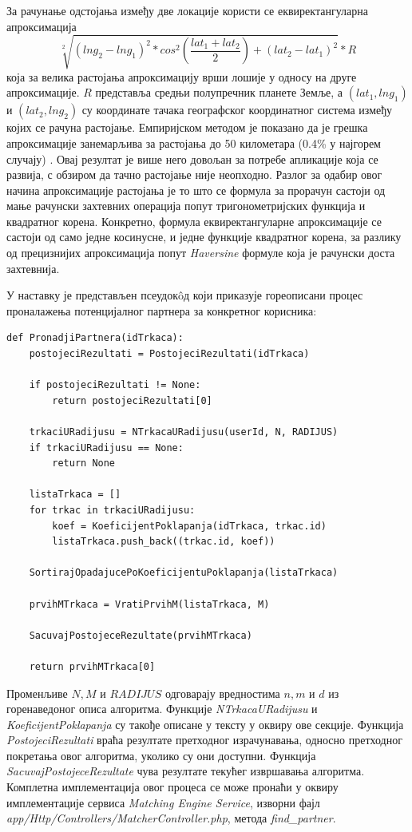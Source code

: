 \documentclass[12pt,oneside]{memoir}
\begin{document}
За рачунање одстојања између две локације користи се еквиректангуларна апроксимација \cite{distance_approximation} \[\sqrt[2]{(lng_2 - lng_1)^2 * cos^2(\frac{lat_1 + lat_2}{2}) + (lat_2 - lat_1)^2} * R\] која за велика растојања апроксимацију врши лошије у односу на друге апроксимације. $R$ представља средњи полупречник планете Земље, а $(lat_1, lng_1)$ и $(lat_2, lng_2)$ су координате тачака географског координатног система између којих се рачуна растојање. Емпиријском методом је показано да је грешка апроксимације занемарљива за растојања до 50 километара (0.4\% у најгорем случају) \cite{geographic_distance_article}. Овај резултат је више него довољан за потребе апликације која се развија, с обзиром да тачно растојање није неопходно. Разлог за одабир овог начина апроксимације растојања је то што се формула за прорачун састоји од мање рачунски захтевних операција попут тригонометријских функција и квадратног корена. Конкретно, формула еквиректангуларне апроксимације се састоји од само једне косинусне, и једне функције квадратног корена, за разлику од прецизнијих апроксимација попут \textit{Haversine} формуле \cite{distance_approximation} која је рачунски доста захтевнија.

У наставку је представљен псеудокôд који приказује гореописани процес проналажења потенцијалног партнера за конкретног корисника:
\begin{english}
\begin{lstlisting}
def PronadjiPartnera(idTrkaca):
    postojeciRezultati = PostojeciRezultati(idTrkaca)

    if postojeciRezultati != None:
        return postojeciRezultati[0]

    trkaciURadijusu = NTrkacaURadijusu(userId, N, RADIJUS)
    if trkaciURadijusu == None:
        return None

    listaTrkaca = []
    for trkac in trkaciURadijusu:
        koef = KoeficijentPoklapanja(idTrkaca, trkac.id)
        listaTrkaca.push_back((trkac.id, koef))

    SortirajOpadajucePoKoeficijentuPoklapanja(listaTrkaca)

    prvihMTrkaca = VratiPrvihM(listaTrkaca, M)
    
    SacuvajPostojeceRezultate(prvihMTrkaca)

    return prvihMTrkaca[0]
\end{lstlisting}
\end{english}
Променљиве $N, M$ и $RADIJUS$ одговарају вредностима $n, m$ и $d$ из горенаведоног описа алгоритма. Функције \textit{NTrkacaURadijusu} и \textit{KoeficijentPoklapanja} су такође описане у тексту у оквиру ове секције. Функција \textit{PostojeciRezultati} враћа резултате претходног израчунавања, односно претходног покретања овог алгоритма, уколико су они доступни. Функција \textit{SacuvajPostojeceRezultate} чува резултате текућег извршавања алгоритма. Комплетна имплементација овог процеса се може пронаћи у оквиру имплементације сервиса \textit{Matching Engine Service}, изворни фајл \textit{app/Http/Controllers/MatcherController.php}, метода \textit{find\_partner}.
\end{document}
